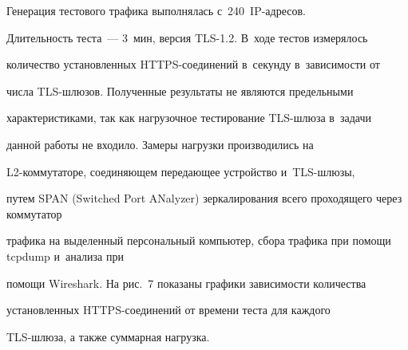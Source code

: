   Генерация тестового трафика выполнялась с~240~IP-ад\-ре\-сов. 


Длительность теста~--- 3~мин, версия TLS-1.2. В~ходе тестов измерялось 


количество установленных HTTPS-со\-еди\-не\-ний в~секунду в~зависимости от 


числа TLS-шлю\-зов. Полученные результаты не являются предельными 


характеристиками, так как нагрузочное тестирование TLS-шлюза в~задачи 


данной работы не входило. Замеры нагрузки производились на  


L2-ком\-му\-та\-то\-ре, соединяющем передающее устройство и~TLS-шлю\-зы, 


путем SPAN (Switched Port ANalyzer) зер\-ка\-ли\-ро\-ва\-ния всего проходящего через коммутатор 


трафика на выделенный персональный компьютер, сбора трафика при помощи tcpdump и~анализа при 


помощи Wireshark. На рис.~7 показаны графики зависимости количества 


установленных HTTPS-со\-еди\-не\-ний от времени теста для каждого  


TLS-шлю\-за, а также суммарная нагрузка.





\pagebreak





\





\vspace*{-12pt}
















